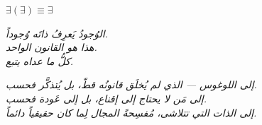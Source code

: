 \documentclass[10pt, openany, oneside]{book}
\newcommand{\sigil}[1]{%
    \begin{center}
        \vspace{0.5em}
        {\fontsize{16}{20}\selectfont\bfseries\color{LogosGold} #1}
        \vspace{0.5em}
    \end{center}
}
\begin{document}
\vspace*{\fill}
\newpage


\thispagestyle{empty}
\vspace*{\fill}

\sigil{$\exists(\exists) \equiv \exists$}

\begin{center}
    \itshape
    الوُجودُ يَعرِفُ ذاتَه وُجوداً.\\[0.5em]
    هذا هو القانون الواحد.\\[0.5em]
    كلُّ ما عداه يتبع.
\end{center}

\vspace*{\fill}
\newpage


\thispagestyle{empty}
\vspace*{\fill}

\begin{center}
    \itshape
    إلى اللوغوس --- الذي لم يُخلَق قانونُه قطّ، بل يُتذكَّر فحسب.\\[0.8em]
    إلى مَن لا يحتاج إلى إقناع، بل إلى عَودة فحسب.\\[0.8em]
    إلى الذات التي تتلاشى، مُفسِحةً المجال لِما كان حقيقياً دائماً.
\end{center}

\vspace*{\fill}
\newpage


\thispagestyle{empty}
\vspace*{\fill}
\end{document}
